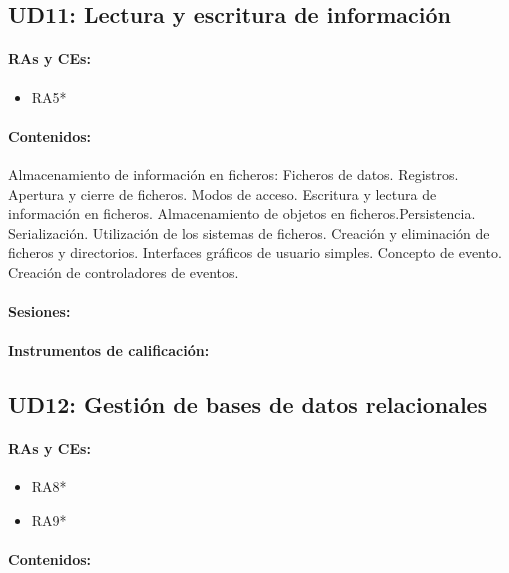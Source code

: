\newpage
\subsection{UD11: Lectura y escritura de información}

	\paragraph{RAs y CEs:}
	\begin{itemize}[itemsep=0.1em, topsep=0.1em]
		\item RA5*
	\end{itemize}

	\paragraph{Contenidos:}
		Almacenamiento de información en ficheros: Ficheros de datos. Registros. Apertura y cierre de ficheros. Modos de acceso. Escritura y lectura de información en ficheros. Almacenamiento de objetos en ficheros.Persistencia. Serialización. Utilización de los sistemas de ficheros. Creación y eliminación de ficheros y directorios.
		Interfaces gráficos de usuario simples. Concepto de evento. Creación de controladores de eventos.

	\paragraph{Sesiones:}
	\paragraph{Instrumentos de calificación:}


\newpage
\subsection{UD12: Gestión de bases de datos relacionales}

	\paragraph{RAs y CEs:}
	\begin{itemize}[itemsep=0.1em, topsep=0.1em]
		\item RA8*
		\item RA9*
	\end{itemize}

	\paragraph{Contenidos:}
		
